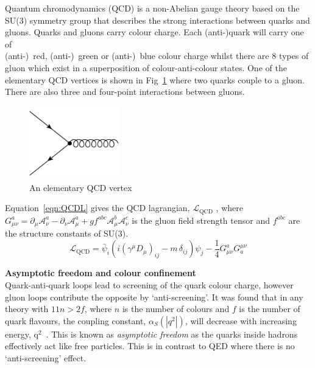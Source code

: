 Quantum chromodynamics (QCD) is a non-Abelian gauge theory based on the SU(3) symmetry group that describes the strong interactions between quarks and gluons. Quarks and gluons carry colour charge. Each (anti-)quark will carry one of \\(anti-)~red, (anti-)~green or (anti-)~blue colour charge whilst there are 8 types of gluon which exist in a superposition of colour-anti-colour states. One of the elementary QCD vertices is shown in Fig~\ref{fig:QCDvertex} where two quarks couple to a gluon. There are also three and four-point interactions between gluons.
\label{subsec:QCD}
\begin{figure}[ht!]
\begin{center}
    \includegraphics[width=0.35\textwidth]{images/Theory/QCDvertex.png}
    \caption{An elementary QCD vertex}
    \label{fig:QCDvertex}
\end{center}
\end{figure}


Equation~\ref{eqn:QCDL} gives the QCD lagrangian, $\mathcal{L}_{\textrm {QCD}}$ , where $G_{\mu \nu }^{a}=\partial _{\mu }{\mathcal {A}}_{\nu }^{a}-\partial _{\nu }{\mathcal {A}}_{\mu }^{a}+gf^{abc}{\mathcal {A}}_{\mu }^{b}{\mathcal {A}}_{\nu }^{c}$ is the gluon field strength tensor and $f^{abc}$ are the structure constants of SU(3).
\begin{equation}
    \label{eqn:QCDL}
{\mathcal {L}}_{\mathrm {QCD} }={\bar {\psi }}_{i}\left(i(\gamma ^{\mu }D_{\mu })_{ij}-m\,\delta _{ij}\right)\psi _{j}-{\frac {1}{4}}G_{\mu \nu }^{a}G_{a}^{\mu \nu }
\end{equation}

\textbf{Asymptotic freedom and colour confinement}\\
Quark-anti-quark loops lead to screening of the quark colour charge, however gluon loops contribute the opposite by `anti-screening'. It was found that in any theory with $11n>2f$, where $n$ is the number of colours and $f$ is the number of quark flavours, the coupling constant, $\alpha_{S}\left( |q^{2}| \right)$, will decrease with increasing energy, q$^{2}$~\cite{PhysRevLett.30.1343,PhysRevLett.30.1346}. This is known as \emph{asymptotic freedom} as the quarks inside hadrons effectively act like free particles. This is in contrast to QED where there is no `anti-screening' effect.

